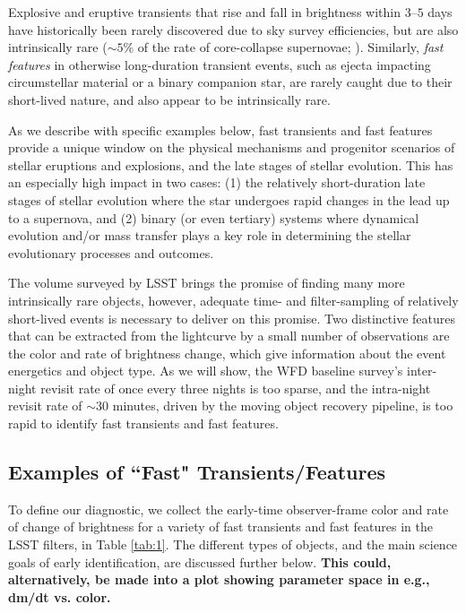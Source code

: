 \documentclass[11pt]{article}
\begin{document}

Explosive and eruptive transients that rise and fall in brightness within $3$--$5$ days have historically been rarely discovered due to sky survey efficiencies, but are also intrinsically rare ($\sim 5\%$ of the rate of core-collapse supernovae; \cite{2014ApJ...794...23D}). Similarly, {\it fast features} in otherwise long-duration transient events, such as ejecta impacting circumstellar material or a binary companion star, are rarely caught due to their short-lived nature, and also appear to be intrinsically rare.

As we describe with specific examples below, fast transients and fast features provide a unique window on the physical mechanisms and progenitor scenarios of stellar eruptions and explosions, and the late stages of stellar evolution. This has an especially high impact in two cases: (1) the relatively short-duration late stages of stellar evolution where the star undergoes rapid changes in the lead up to a supernova, and (2) binary (or even tertiary) systems where dynamical evolution and/or mass transfer plays a key role in determining the stellar evolutionary processes and outcomes. 

The volume surveyed by LSST brings the promise of finding many more intrinsically rare objects, however, adequate time- and filter-sampling of relatively short-lived events is necessary to deliver on this promise. Two distinctive features that can be extracted from the lightcurve by a small number of observations are the color and rate of brightness change, which give information about the event energetics and object type. As we will show, the WFD baseline survey's inter-night revisit rate of once every three nights is too sparse, and the intra-night revisit rate of $\sim30$ minutes, driven by the moving object recovery pipeline, is too rapid to identify fast transients and fast features. 

\subsection{Examples of ``Fast" Transients/Features}

To define our diagnostic, we collect the early-time observer-frame color and rate of change of brightness for a variety of fast transients and fast features in the LSST filters, in Table \ref{tab:1}. The different types of objects, and the main science goals of early identification, are discussed further below. {\bf This could, alternatively, be made into a plot showing parameter space in e.g., dm/dt vs. color.}
\end{document}
